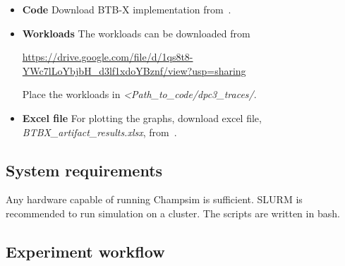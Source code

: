 \begin{itemize}
\item \textbf{Code} Download BTB-X implementation from~\cite{btbx-artifacts}. 

\item \textbf{Workloads} The workloads can be downloaded from  

\url{https://drive.google.com/file/d/1qs8t8-YWc7lLoYbjbH\_d3lf1xdoYBznf/view?usp=sharing}

Place the workloads in \emph{\textless Path\_to\_code/dpc3\_traces/}.

\item \textbf{Excel file} For plotting the graphs, download excel file, \emph{BTBX\_artifact\_results.xlsx}, from~\cite{btbx-artifacts}.

\end{itemize}

\subsection{System requirements}
Any hardware capable of running Champsim is sufficient. SLURM is recommended to run simulation on a cluster. The scripts are written in bash.

\subsection{Experiment workflow}

